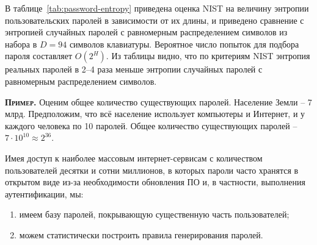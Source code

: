\documentclass[10pt,a4paper,openany]{book}
\newcommand{\example}{\textsc{\textbf{Пример.}} }
\begin{document}
\begin{table}[!ht]
    \centering
    \caption{Оценка NIST предполагаемой энтропии паролей\label{tab:password-entropy}}
\end{table}

В таблице~\ref{tab:password-entropy} приведена оценка NIST на величину энтропии пользовательских паролей в зависимости от их длины, и приведено сравнение с энтропией случайных паролей с равномерным распределением символов из набора в $D=94$ символов клавиатуры. Вероятное число попыток для подбора пароля составляет $O(2^H)$. Из таблицы видно, что по критериям NIST энтропия реальных паролей в 2--4 раза меньше энтропии случайных паролей с равномерным распределением символов.

\example
Оценим общее количество существующих паролей. Население Земли -- 7 млрд. Предположим, что всё население использует компьютеры и Интернет, и у каждого человека по 10 паролей. Общее количество существующих паролей -- $7 \cdot 10^{10} \approx 2^{36}$.

Имея доступ к наиболее массовым интернет-сервисам с количеством пользователей десятки и сотни миллионов, в которых пароли часто хранятся в открытом виде из-за необходимости обновления ПО и, в частности, выполнения аутентификации, мы:
\begin{enumerate}
	\item имеем базу паролей, покрывающую существенную часть пользователей; 
	\item можем статистически построить правила генерирования паролей.
\end{enumerate}
\end{document}
